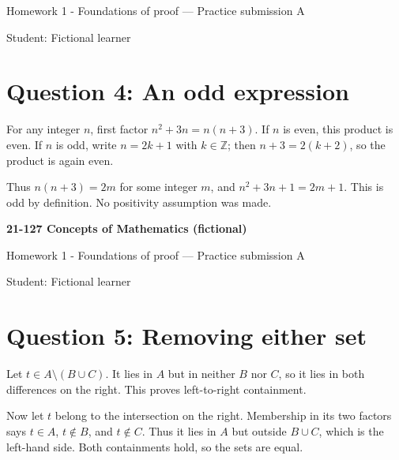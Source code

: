 \documentclass[11pt]{article}
\begin{document}
Homework 1 - Foundations of proof --- Practice submission A

Student: Fictional learner

\section*{Question 4: An odd expression}

For any integer $n$, first factor $n^2+3n=n(n+3)$. If $n$ is even, this product is even. If $n$ is odd, write $n=2k+1$ with $k\in\mathbb{Z}$; then $n+3=2(k+2)$, so the product is again even.

Thus $n(n+3)=2m$ for some integer $m$, and $n^2+3n+1=2m+1$. This is odd by definition. No positivity assumption was made.

\newpage
\textbf{21-127 Concepts of Mathematics (fictional)}

Homework 1 - Foundations of proof --- Practice submission A

Student: Fictional learner

\section*{Question 5: Removing either set}

Let $t\in A\setminus(B\cup C)$. It lies in $A$ but in neither $B$ nor $C$, so it lies in both differences on the right. This proves left-to-right containment.

Now let $t$ belong to the intersection on the right. Membership in its two factors says $t\in A$, $t\notin B$, and $t\notin C$. Thus it lies in $A$ but outside $B\cup C$, which is the left-hand side. Both containments hold, so the sets are equal.
\end{document}
